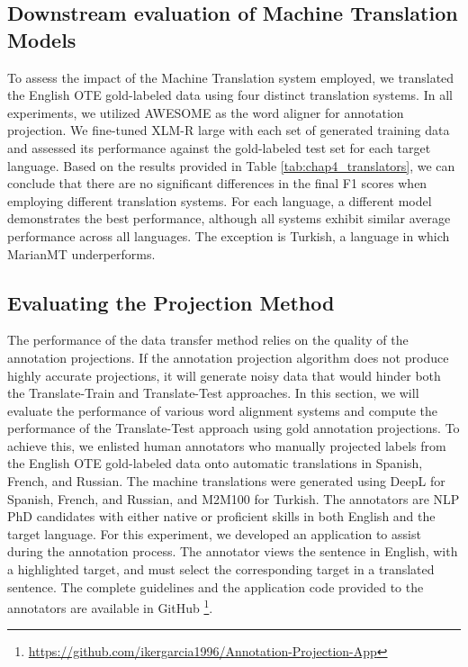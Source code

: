 \subsection{Downstream evaluation of Machine Translation Models}
\label{chap4:sec_transaltionbenchmark}

To assess the impact of the Machine Translation system employed, we translated the English OTE gold-labeled data using four distinct translation systems. In all experiments, we utilized AWESOME as the word aligner for annotation projection. We fine-tuned XLM-R large with each set of generated training data and assessed its performance against the gold-labeled test set for each target language. Based on the results provided in Table \ref{tab:chap4_translators}, we can conclude that there are no significant differences in the final F1 scores when employing different translation systems. For each language, a different model demonstrates the best performance, although all systems exhibit similar average performance across all languages. The exception is Turkish,  a language in which MarianMT underperforms.



\subsection{Evaluating the Projection Method}
\label{chap4:sec_alignmentbenchmark}

The performance of the data transfer method relies on the quality of the annotation projections. If the annotation projection algorithm does not produce highly accurate projections, it will generate noisy data that would hinder both the Translate-Train and Translate-Test approaches. In this section, we will evaluate the performance of various word alignment systems and compute the performance of the Translate-Test approach using gold annotation projections. To achieve this, we enlisted human annotators who manually projected labels from the English OTE gold-labeled data onto automatic translations in Spanish, French, and Russian. The machine translations were generated using DeepL for Spanish, French, and Russian, and M2M100 for Turkish. The annotators are NLP PhD candidates with either native or proficient skills in both English and the target language. For this experiment, we developed an application to assist during the annotation process. The annotator views the sentence in English, with a highlighted target, and must select the corresponding target in a translated sentence. The complete guidelines and the application code provided to the annotators are available in GitHub \footnote{\url{https://github.com/ikergarcia1996/Annotation-Projection-App}}.

